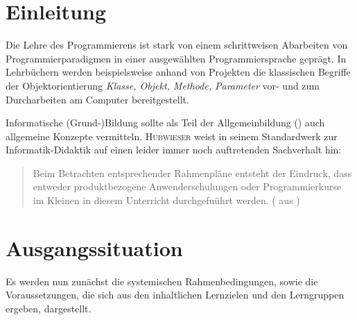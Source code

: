 \documentclass[paper=a4, DIV=13, BCOR=12mm, twoside=on, onecolumn=on, open = any, titlepage =on, parskip =half-, headsepline = on, footsepline = on, chapterprefix = on, sectionprefix = on, appendixprefix = off, fontsize = 11pt, numbers = noenddot, abstract = off]{scrreprt}
\begin{document}
\newpage
\thispagestyle{plain}




\thispagestyle{empty}
\newpage
\thispagestyle{empty}

%
%
{}
\newcommand{\hsp}{\hspace{20pt}}
\titleformat{\chapter}[hang]{\Large\bfseries}{\thechapter\hsp\textcolor{gray75}{|}\hsp}{0pt}{\Large\bfseries}

\tableofcontents
\cleardoublepage
{}
\par \singlespacing
\renewcommand*{\dictumwidth}{.6667\textwidth}
\chapter{Einleitung}
\label{sec:einleitung}
\onehalfspacing


Die Lehre des Programmierens ist stark von einem schrittweisen Abarbeiten von Programmierparadigmen in einer ausgewählten Programmiersprache geprägt. In Lehrbüchern werden beispielsweise anhand von Projekten die klassischen Begriffe der Objektorientierung \emph{Klasse, Objekt, Methode, Parameter} vor- und zum Durcharbeiten am Computer bereitgestellt.

Informatische (Grund-)Bildung sollte als Teil der Allgemeinbildung () auch allgemeine Konzepte vermitteln. \textsc{Hubwieser} weist in seinem Standardwerk zur Informatik-Didaktik auf einen leider immer noch auftretenden Sachverhalt hin:
\begin{quote}
Beim Betrachten entsprechender Rahmenpläne entsteht der Eindruck, dass entweder produktbezogene Anwenderschulungen oder Programmierkurse im Kleinen in diesem Unterricht durchgefuührt werden. (\cite[S.40]{hubwieser:07} aus \cite{koerber:93})
\end{quote}

\newpage
\par\singlespacing
\chapter{Ausgangssituation}
Es werden nun zunächst die systemischen Rahmenbedingungen, sowie die Voraussetzungen, die sich aus den inhaltlichen Lernzielen und den Lerngruppen ergeben, dargestellt.
\par\singlespacing
\end{document}
